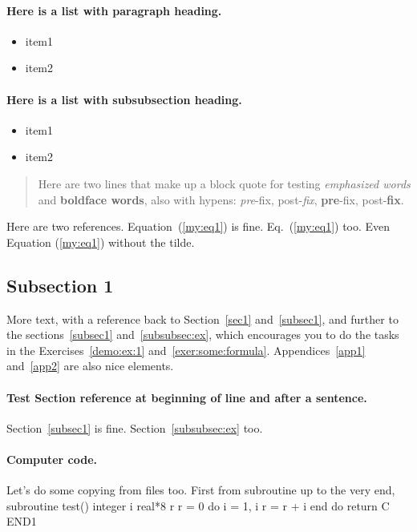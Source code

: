 \documentclass[%
oneside,                 %
final,                   %
10pt]{article}
\theoremstyle{definition}
\begin{document}
\paragraph{Here is a list with paragraph heading.}
\begin{itemize}
  \item item1
  \item item2
\end{itemize}
\noindent
\paragraph{Here is a list with subsubsection heading.}
\begin{itemize}
  \item item1
  \item item2
\end{itemize}
\noindent

\begin{quote}
Here are two lines that make up
a block quote for testing \emph{emphasized words} and \textbf{boldface words},
also with hypens:
\emph{pre}-fix, post-\emph{fix}, \textbf{pre}-fix, post-\textbf{fix}.
\end{quote}

Here are two references. Equation~(\ref{my:eq1}) is fine. Eq.~(\ref{my:eq1}) too.
Even Equation (\ref{my:eq1}) without the tilde.
\subsection{Subsection 1}
\label{subsec1}
More text, with a reference back to
Section~\vref{sec1} and~\vref{subsec1}, and further to the
sections~\vref{subsec1} and~\vref{subsubsec:ex}, which
encourages you to do the tasks in the
Exercises~\vref{demo:ex:1} and~\vref{exer:some:formula}.
Appendices~\vref{app1} and~\vref{app2} are also nice elements.
\paragraph{Test Section reference at beginning of line and after a sentence.}
Section~\vref{subsec1} is fine.
Section~\vref{subsubsec:ex} too.
\paragraph{Computer code.}
Let's do some copying from files too. First from subroutine up to the very end,
\bfcod
      subroutine test()
      integer i
      real*8 r
      r = 0
      do i = 1, i
         r = r + i
      end do
      return
C     END1
\end{document}
